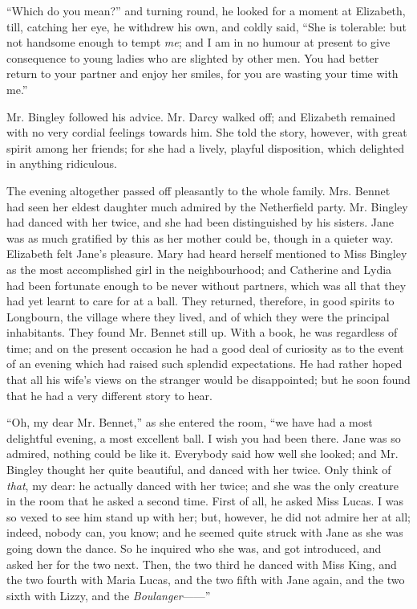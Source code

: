 \documentclass[12pt]{book}
\begin{document}
``Which do you mean?'' and turning round, he looked for a moment at Elizabeth, till, catching her eye, he withdrew his own, and coldly said, ``She is tolerable: but not handsome enough to tempt \textit{me}; and I am in no humour at present to give consequence to young ladies who are slighted by other men. You had better return to your partner and enjoy her smiles, for you are wasting your time with me.''

Mr. Bingley followed his advice. Mr. Darcy walked off; and Elizabeth remained with no very cordial feelings towards him. She told the story, however, with great spirit among her friends; for she had a lively, playful disposition, which delighted in anything ridiculous.

The evening altogether passed off pleasantly to the whole family. Mrs. Bennet had seen her eldest daughter much admired by the Netherfield party. Mr. Bingley had danced with her twice, and she had been distinguished by his sisters. Jane was as much gratified by this as her mother could be, though in a quieter way. Elizabeth felt Jane's pleasure. Mary had heard herself mentioned to Miss Bingley as the most accomplished girl in the neighbourhood; and Catherine and Lydia had been fortunate enough to be never without partners, which was all that they had yet learnt to care for at a ball. They returned, therefore, in good spirits to Longbourn, the village where they lived, and of which they were the principal inhabitants. They found Mr. Bennet still up. With a book, he was regardless of time; and on the present occasion he had a good deal of curiosity as to the event of an evening which had raised such splendid expectations. He had rather hoped that all his wife's views on the stranger would be disappointed; but he soon found that he had a very different story to hear.

``Oh, my dear Mr. Bennet,'' as she entered the room, ``we have had a most delightful evening, a most excellent ball. I wish you had been there. Jane was so admired, nothing could be like it. Everybody said how well she looked; and Mr. Bingley thought her quite beautiful, and danced with her twice. Only think of \textit{that}, my dear: he actually danced with her twice; and she was the only creature in the room that he asked a second time. First of all, he asked Miss Lucas. I was so vexed to see him stand up with her; but, however, he did not admire her at all; indeed, nobody can, you know; and he seemed quite struck with Jane as she was going down the dance. So he inquired who she was, and got introduced, and asked her for the two next. Then, the two third he danced with Miss King, and the two fourth with Maria Lucas, and the two fifth with Jane again, and the two sixth with Lizzy, and the \textit{Boulanger}------''
\end{document}
